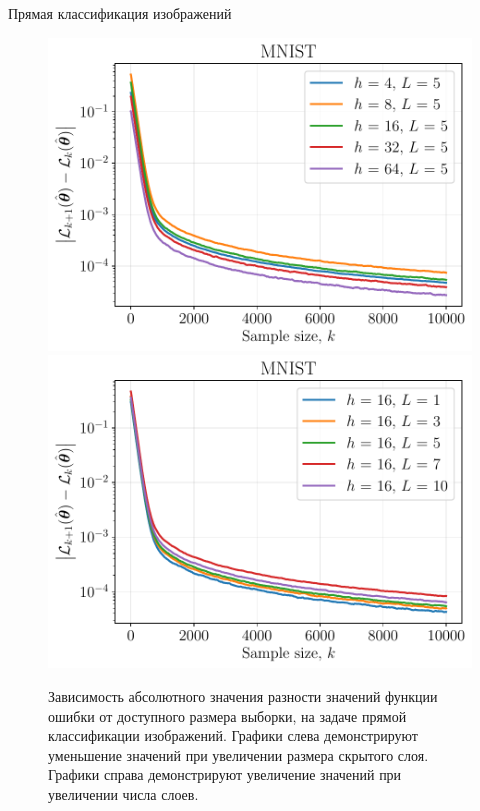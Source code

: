 \documentclass[aspectratio=169]{beamer}
\begin{document}
\begin{frame}{Прямая классификация изображений}
    \begin{figure}[ht]
        \centering
        \includegraphics[width=0.5\linewidth]{../paper/figs/mnist_hidden_size.pdf}\hfill
        \includegraphics[width=0.5\linewidth]{../paper/figs/mnist_num_layers.pdf}
        \caption{Зависимость абсолютного значения разности значений функции ошибки от доступного размера выборки, на задаче прямой классификации изображений. Графики слева демонстрируют уменьшение значений при увеличении размера скрытого слоя. Графики справа демонстрируют увеличение значений при увеличении числа слоев.}
    \end{figure}
\end{frame}
\end{document}
